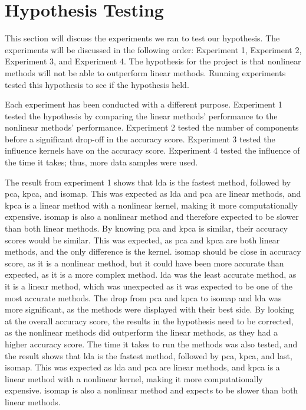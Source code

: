\section{Hypothesis Testing} \label{sec:experiments}
This section will discuss the experiments we ran to test our hypothesis. The experiments will be discussed in the following order: Experiment 1, Experiment 2, Experiment 3, and Experiment 4. The hypothesis for the project is that nonlinear methods will not be able to outperform linear methods. Running experiments tested this hypothesis to see if the hypothesis held. 

Each experiment has been conducted with a different purpose. Experiment 1 tested the hypothesis by comparing the linear methods' performance to the nonlinear methods' performance. Experiment 2 tested the number of components before a significant drop-off in the accuracy score. Experiment 3 tested the influence kernels have on the accuracy score. Experiment 4 tested the influence of the time it takes; thus, more data samples were used.

The result from experiment 1 shows that \gls{lda} is the fastest method, followed by \gls{pca}, \gls{kpca}, and \gls{isomap}. This was expected as \gls{lda} and \gls{pca} are linear methods, and \gls{kpca} is a linear method with a nonlinear kernel, making it more computationally expensive. \gls{isomap} is also a nonlinear method and therefore expected to be slower than both linear methods. By knowing \gls{pca} and \gls{kpca} is similar, their accuracy scores would be similar. This was expected, as \gls{pca} and \gls{kpca} are both linear methods, and the only difference is the kernel. \gls{isomap} should be close in accuracy score, as it is a nonlinear method, but it could have been more accurate than expected, as it is a more complex method. \gls{lda} was the least accurate method, as it is a linear method, which was unexpected as it was expected to be one of the most accurate methods. The drop from \gls{pca} and \gls{kpca} to \gls{isomap} and \gls{lda} was more significant, as the methods were displayed with their best side. By looking at the overall accuracy score, the results in the hypothesis need to be corrected, as the nonlinear methods did outperform the linear methods, as they had a higher accuracy score. The time it takes to run the methods was also tested, and the result shows that \gls{lda} is the fastest method, followed by \gls{pca}, \gls{kpca}, and last, \gls{isomap}. This was expected as \gls{lda} and \gls{pca} are linear methods, and \gls{kpca} is a linear method with a nonlinear kernel, making it more computationally expensive. \gls{isomap} is also a nonlinear method and expects to be slower than both linear methods.


